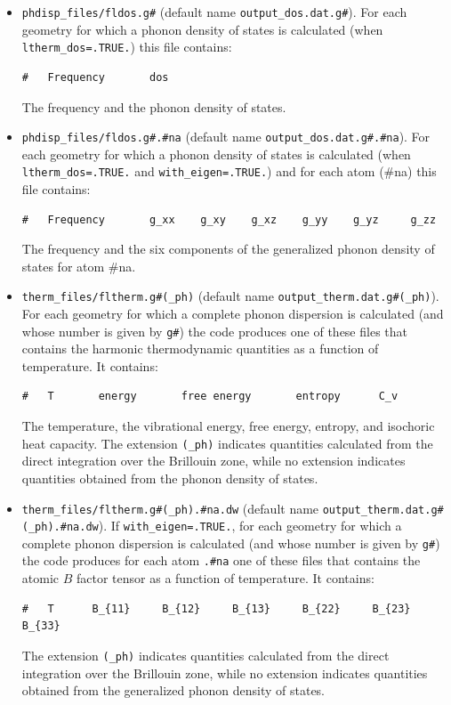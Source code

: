 \documentclass[12pt,a4paper]{article}
\begin{document}
\begin{itemize}
\item 
\texttt{phdisp\_files/fldos.g\#} (default name 
\texttt{output\_dos.dat.g\#}). For each geometry for which a phonon density of 
states is calculated (when \texttt{ltherm\_dos=.TRUE.}) this file contains:
\begin{verbatim}
#   Frequency       dos
\end{verbatim}
The frequency and the phonon density of states. 

\item 
\texttt{phdisp\_files/fldos.g\#.\#na} (default name 
\texttt{output\_dos.dat.g\#.\#na}). For each geometry for which a phonon 
density of states is calculated (when \texttt{ltherm\_dos=.TRUE.} and
\texttt{with\_eigen=.TRUE.}) and for each atom (\#na) this file contains: 
\begin{verbatim}
#   Frequency       g_xx    g_xy    g_xz    g_yy    g_yz     g_zz
\end{verbatim}
The frequency and the six components of the generalized phonon density of 
states for atom \#na. 

\item 
\texttt{therm\_files/fltherm.g\#(\_ph)} (default name 
\texttt{output\_therm.dat.g\#(\_ph)}). For each geometry for which 
a complete phonon dispersion is calculated (and whose number is given
by \texttt{g\#}) the code produces one of these files that contains 
the harmonic 
thermodynamic quantities as a function of temperature. It contains:
\begin{verbatim}
#   T       energy       free energy       entropy      C_v 
\end{verbatim}
The temperature, the vibrational energy, free energy, entropy, and
isochoric heat capacity. The extension \texttt{(\_ph)} indicates 
quantities calculated from the direct integration over the Brillouin zone,
while no extension indicates quantities obtained from the phonon density 
of states.

\item 
\texttt{therm\_files/fltherm.g\#(\_ph).\#na.dw} (default name 
\texttt{output\_therm.dat.g\#(\_ph).\#na.dw}). 
If \texttt{with\_eigen=.TRUE.}, for each geometry for which 
a complete phonon dispersion is calculated (and whose number is given
by \texttt{g\#}) the code produces for each atom \texttt{.\#na} one of these 
files that contains the atomic $B$ factor tensor as a function of 
temperature. It contains:
\begin{verbatim}
#   T      B_{11}     B_{12}     B_{13}     B_{22}     B_{23}     B_{33}
\end{verbatim}
The extension \texttt{(\_ph)} indicates 
quantities calculated from the direct integration over the Brillouin zone,
while no extension indicates quantities obtained from the generalized phonon 
density of states.


\end{itemize}
\end{document}
